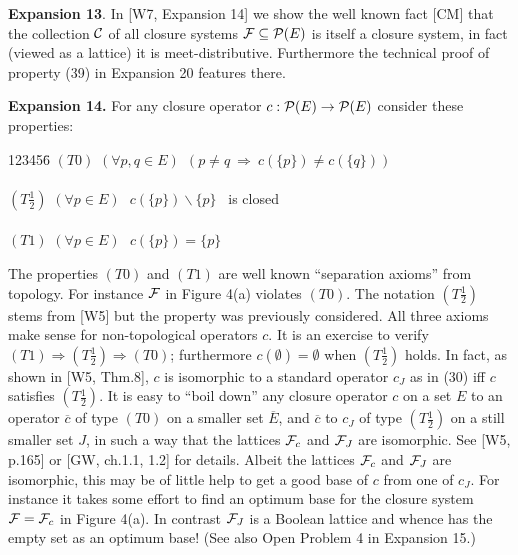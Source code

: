 \documentclass[11pt]{article}
\newcommand{\ol}{\overline}
\newcommand{\ra}{\rightarrow}
\newcommand{\Ra}{\Rightarrow}
\begin{document}
{\bf Expansion 13}.  In [W7, Expansion 14] we show the well known fact [CM] that the collection ${\cal C}$ of all closure systems ${\cal F} \subseteq {\cal P}(E)$ is itself a closure system, in fact (viewed as a lattice) it is meet-distributive. Furthermore the technical proof of property (39) in Expansion 20 features there.


{\bf Expansion 14.} For any closure operator $c : {\cal P}(E) \ra {\cal P}(E)$ consider these properties:

\begin{tabbing}
123456\=\kill
$(T 0)$ \> $(\forall p, q \in E) \ \ (p \neq q \ \Ra \ c(\{p\}) \neq c(\{q\}))$\\
\\
$(T \frac{1}{2})$ \> $(\forall p \in E) \ \ \ c(\{p\}) \backslash \{p\}$ \ is closed\\
\\
$(T 1)$ \> $(\forall p \in E) \ \ \ c(\{p\}) = \{p\}$\\ 
\end{tabbing}

The properties $(T 0)$ and $(T 1)$ are well known ``separation axioms'' from topology. For instance ${\cal F}$ in Figure 4(a) violates $(T0)$.
The notation $(T \frac{1}{2})$ stems from [W5] but the property was previously considered. All three axioms make sense for non-topological operators $c$. It is an exercise to verify $(T 1) \Ra (T \frac{1}{2}) \Ra (T 0)$; furthermore $c(\emptyset) = \emptyset$ when $(T \frac{1}{2})$ holds. In fact, as shown in [W5, Thm.8], $c$ is isomorphic to a standard operator $c_J$ as in (30) iff $c$ satisfies $(T \frac{1}{2})$. It is easy to ``boil down'' any closure operator $c$ on a set $E$ to an operator $\ol{c}$ of type $(T 0)$ on a smaller set $\ol{E}$, and $\ol{c}$ to $c_J$ of type $(T \frac{1}{2})$ on a still smaller set $J$, in such a way that the lattices ${\cal F}_c$ and ${\cal F}_J$ are isomorphic.
See [W5, p.165] or [GW, ch.1.1, 1.2] for details.  
Albeit the lattices ${\cal F}_c$ and ${\cal F}_J$ are isomorphic, this may be of little help to get a good base of $c$ from one of $c_J$. For instance it takes some effort to find an optimum base for the closure system ${\cal F} ={\cal F}_c$ in Figure 4(a). In contrast ${\cal F}_J$ is a Boolean lattice and whence has the empty set as an optimum base! (See also Open Problem 4 in Expansion 15.)
\end{document}
